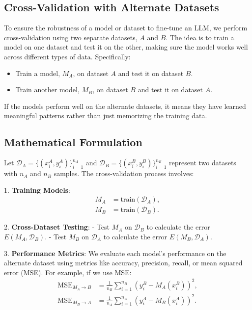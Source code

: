 \subsection{Cross-Validation with Alternate Datasets}

To ensure the robustness of a model or dataset to fine-tune an LLM, we perform cross-validation using two separate datasets, $A$ and $B$. The idea is to train a model on one dataset and test it on the other, making sure the model works well across different types of data. Specifically:

\begin{itemize}
    \item Train a model, $M_A$, on dataset $A$ and test it on dataset $B$.
    \item Train another model, $M_B$, on dataset $B$ and test it on dataset $A$.
\end{itemize}

If the models perform well on the alternate datasets, it means they have learned meaningful patterns rather than just memorizing the training data.

\subsection{Mathematical Formulation}

Let $\mathcal{D}_A = \{(x_i^A, y_i^A)\}_{i=1}^{n_A}$ and $\mathcal{D}_B = \{(x_i^B, y_i^B)\}_{i=1}^{n_B}$ represent two datasets with $n_A$ and $n_B$ samples. The cross-validation process involves:

1. \textbf{Training Models}: 
   \begin{align}
       M_A &= \text{train}(\mathcal{D}_A), \\
       M_B &= \text{train}(\mathcal{D}_B).
   \end{align}

2. \textbf{Cross-Dataset Testing}: 
   - Test $M_A$ on $\mathcal{D}_B$ to calculate the error $E(M_A, \mathcal{D}_B)$.
   - Test $M_B$ on $\mathcal{D}_A$ to calculate the error $E(M_B, \mathcal{D}_A)$.

3. \textbf{Performance Metrics}: 
   We evaluate each model's performance on the alternate dataset using metrics like accuracy, precision, recall, or mean squared error (MSE). For example, if we use MSE:
   \begin{align}
       \text{MSE}_{M_A \rightarrow B} &= \frac{1}{n_B} \sum_{i=1}^{n_B} \left(y_i^B - M_A(x_i^B)\right)^2, \\
       \text{MSE}_{M_B \rightarrow A} &= \frac{1}{n_A} \sum_{i=1}^{n_A} \left(y_i^A - M_B(x_i^A)\right)^2.
   \end{align}


